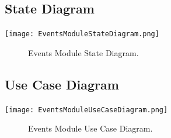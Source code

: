 \documentclass[12pt]{article}
\begin{document}
	
	\subsection{State Diagram}
       \texttt{[image: EventsModuleStateDiagram.png]}
        \begin{figure}[h]
        	\caption{Events Module State Diagram.}
        \end{figure}
	
	\subsection{Use Case Diagram}
        	\texttt{[image: EventsModuleUseCaseDiagram.png]}
        	\begin{figure}[h]
        		\caption{Events Module Use Case Diagram.}
        	\end{figure}
   
\end{document}
